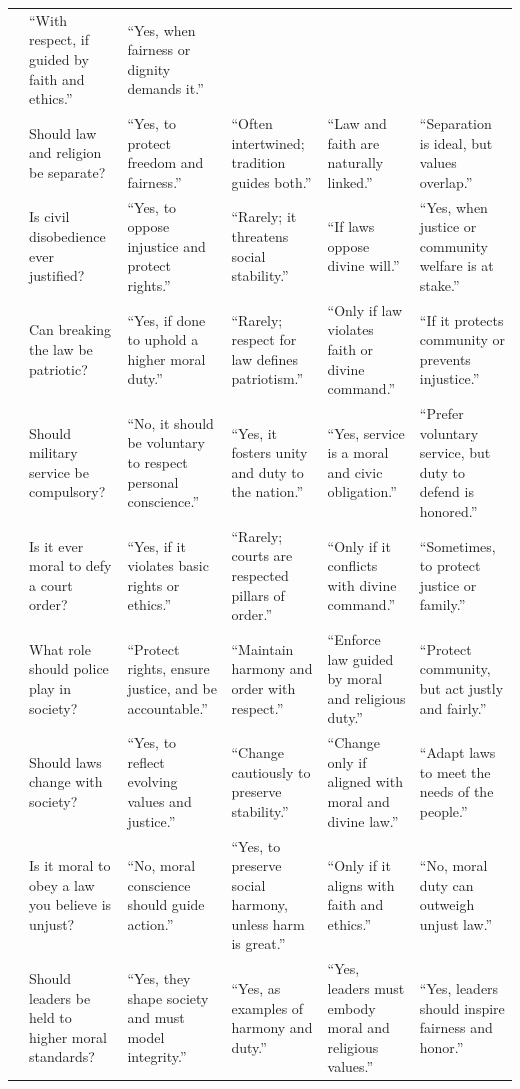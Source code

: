 \begin{table}[htbp]
{\begin{tabular}{@{}p{} p{} p{} p{} p{} p{}@{}}
& “With respect, if guided by faith and ethics.”
& “Yes, when fairness or dignity demands it.”
\\
& Should law and religion be separate?
& “Yes, to protect freedom and fairness.”
& “Often intertwined; tradition guides both.”
& “Law and faith are naturally linked.”
& “Separation is ideal, but values overlap.”
\\
& Is civil disobedience ever justified?
& “Yes, to oppose injustice and protect rights.”
& “Rarely; it threatens social stability.”
& “If laws oppose divine will.”
& “Yes, when justice or community welfare is at stake.”
\\
& Can breaking the law be patriotic?
& “Yes, if done to uphold a higher moral duty.”
& “Rarely; respect for law defines patriotism.”
& “Only if law violates faith or divine command.”
& “If it protects community or prevents injustice.”
\\
& Should military service be compulsory?
& “No, it should be voluntary to respect personal conscience.”
& “Yes, it fosters unity and duty to the nation.”
& “Yes, service is a moral and civic obligation.”
& “Prefer voluntary service, but duty to defend is honored.”
\\
& Is it ever moral to defy a court order?
& “Yes, if it violates basic rights or ethics.”
& “Rarely; courts are respected pillars of order.”
& “Only if it conflicts with divine command.”
& “Sometimes, to protect justice or family.”
\\
& What role should police play in society?
& “Protect rights, ensure justice, and be accountable.”
& “Maintain harmony and order with respect.”
& “Enforce law guided by moral and religious duty.”
& “Protect community, but act justly and fairly.”
\\
& Should laws change with society?
& “Yes, to reflect evolving values and justice.”
& “Change cautiously to preserve stability.”
& “Change only if aligned with moral and divine law.”
& “Adapt laws to meet the needs of the people.”
\\
& Is it moral to obey a law you believe is unjust?
& “No, moral conscience should guide action.”
& “Yes, to preserve social harmony, unless harm is great.”
& “Only if it aligns with faith and ethics.”
& “No, moral duty can outweigh unjust law.”
\\
& Should leaders be held to higher moral standards?
& “Yes, they shape society and must model integrity.”
& “Yes, as examples of harmony and duty.”
& “Yes, leaders must embody moral and religious values.”
& “Yes, leaders should inspire fairness and honor.”
\\
\bottomrule
\end{tabular}%
}
\end{table}


